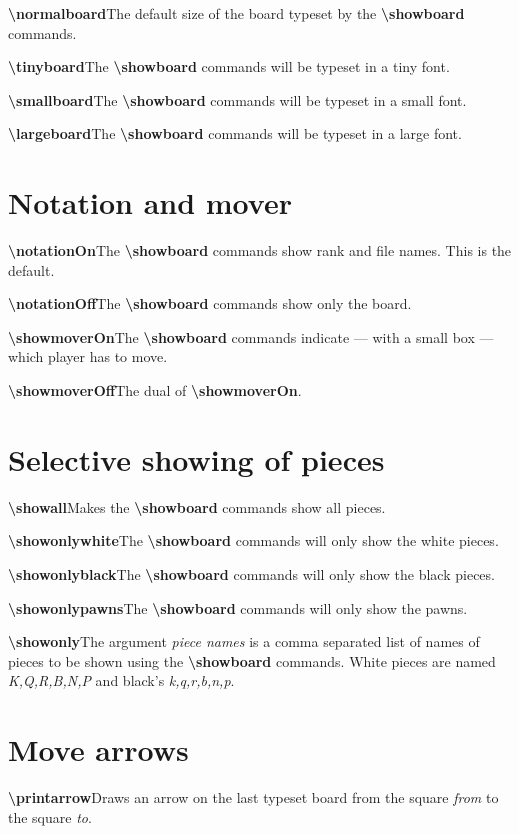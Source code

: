 \documentclass[10pt,a4paper,twocolumn,landscape]{article}
\newcommand{\Cmd}[1]{\textsf{\textbf{\textbackslash#1}}}
\newcommand{\Arg}[1]{\textsf{\textsl{#1}}}
\newcommand{\ArgInDescription}[1]{\Arg{\{#1\}}}
\newcommand{\command}[3]{\Cmd{#1}\Apply{\ArgInDescription}{\Listize[#2]}\newline#3\smallskip}
\newcommand{\simpleCommand}[2]{\Cmd{#1}\newline#2\smallskip}
\begin{document}
\simpleCommand{normalboard}
{The default size of the board typeset by the \Cmd{showboard}
  commands.}

\newcommand{\boardsize}[1]{
\simpleCommand{#1board}
{The \Cmd{showboard} commands will be typeset in a #1 font.}}

\boardsize{tiny}

\boardsize{small}

\boardsize{large}

\section{Notation and mover}

\simpleCommand{notationOn}
{The \Cmd{showboard} commands show rank and file names. This is the
  default.}

\simpleCommand{notationOff}
{The \Cmd{showboard} commands show only the board.}

\simpleCommand{showmoverOn}
{The \Cmd{showboard} commands indicate --- with a small box --- which
  player has to move.}

\simpleCommand{showmoverOff}
{The dual of \Cmd{showmoverOn}.}



\section{Selective showing of pieces}

\simpleCommand{showall}
{Makes the \Cmd{showboard} commands show all pieces.}

\simpleCommand{showonlywhite}
{The \Cmd{showboard} commands will only show the white pieces.}

\simpleCommand{showonlyblack}
{The \Cmd{showboard} commands will only show the black pieces.}

\simpleCommand{showonlypawns}
{The \Cmd{showboard} commands will only show the pawns.}

\command{showonly}{piece names}
{The argument \Arg{piece names} is a comma separated list of names of
  pieces to be shown using the \Cmd{showboard} commands. White pieces
  are named \Arg{K,Q,R,B,N,P} and black's \Arg{k,q,r,b,n,p}.}

\section{Move arrows}

\command{printarrow}{from,to} 
{Draws an arrow on the last typeset
  board from the square \Arg{from} to the square \Arg{to}.}
\end{document}
